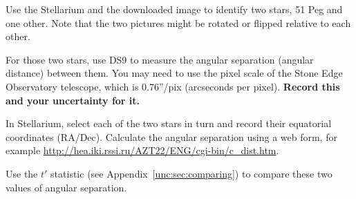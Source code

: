 \begin{steps}
	\item Use the Stellarium and the downloaded image to identify two stars, 51 Peg and one other. Note that the two pictures might be rotated or flipped relative to each other.
	
	\item For those two stars, use DS9 to measure the angular separation (angular distance) between them. You may need to use the pixel scale of the Stone Edge Observatory telescope, which is 0.76''/pix (arcseconds per pixel). \textbf{Record this and your uncertainty for it.}
	
	\item In Stellarium, select each of the two stars in turn and record their equatorial coordinates (RA/Dec). Calculate the angular separation using a web form, for example \url{http://hea.iki.rssi.ru/AZT22/ENG/cgi-bin/c_dist.htm}.
	
	\item Use the $t'$ statistic (see Appendix\ \ref{unc:sec:comparing}) to compare these two values of angular separation.
	
	
\end{steps}



